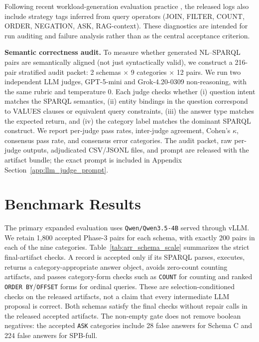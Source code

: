 \documentclass[11pt]{article}
\begin{document}
Following recent workload-generation evaluation practice \citep{zheng2024crossmodel}, the released logs also include strategy tags inferred from query operators (JOIN, FILTER, COUNT, ORDER, NEGATION, ASK, RAG-context). These diagnostics are intended for run auditing and failure analysis rather than as the central acceptance criterion.

\textbf{Semantic correctness audit.} To measure whether generated NL--SPARQL pairs are semantically aligned (not just syntactically valid), we construct a 216-pair stratified audit packet: 2 schemas \(\times\) 9 categories \(\times\) 12 pairs. We run two independent LLM judges, GPT-5-mini and Grok-4.20-0309 non-reasoning, with the same rubric and temperature 0. Each judge checks whether (i) question intent matches the SPARQL semantics, (ii) entity bindings in the question correspond to VALUES clauses or equivalent query constraints, (iii) the answer type matches the expected return, and (iv) the category label matches the dominant SPARQL construct. We report per-judge pass rates, inter-judge agreement, Cohen's \(\kappa\), consensus pass rate, and consensus error categories. The audit packet, raw per-judge outputs, adjudicated CSV/JSONL files, and prompt are released with the artifact bundle; the exact prompt is included in Appendix Section~\ref{app:llm_judge_prompt}.

\section{Benchmark Results}
The primary expanded evaluation uses \texttt{Qwen/Qwen3.5-4B} served through vLLM. We retain 1{,}800 accepted Phase-3 pairs for each schema, with exactly 200 pairs in each of the nine categories. Table~\ref{tab:arr_schema_scale} summarizes the strict final-artifact checks. A record is accepted only if its SPARQL parses, executes, returns a category-appropriate answer object, avoids zero-count counting artifacts, and passes category-form checks such as \texttt{COUNT} for counting and ranked \texttt{ORDER BY}/\texttt{OFFSET} forms for ordinal queries. These are selection-conditioned checks on the released artifacts, not a claim that every intermediate LLM proposal is correct. Both schemas satisfy the final checks without repair calls in the released accepted artifacts. The non-empty gate does not remove boolean negatives: the accepted \texttt{ASK} categories include 28 false answers for Schema C and 224 false answers for SPB-full.
\end{document}
